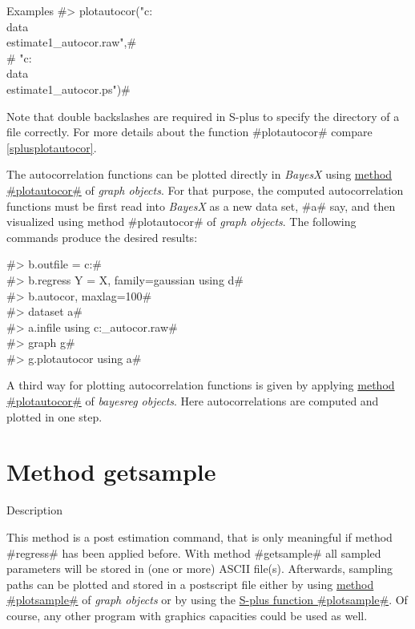 \begin{stanza}{Examples}
 #> plotautocor("c:\\data\\estimate1_autocor.raw",#\\
 #  "c:\\data\\estimate1_autocor.ps")#

Note that double backslashes are required in S-plus to specify the
directory of a file correctly. For more details about the function
#plotautocor# compare \autoref{splusplotautocor}.

The autocorrelation functions can be plotted directly in {\em
BayesX} using \hyperref[graphplotautocor]{method #plotautocor#} of
{\em graph objects}. For that purpose, the computed autocorrelation
functions must be first read into {\em BayesX} as a new data set,
#a# say, and then visualized using method #plotautocor# of {\em
graph objects}. The following commands produce the desired results:

#> b.outfile = c:\data{}# \\
#> b.regress Y = X, family=gaussian using d# \\
#> b.autocor, maxlag=100# \\
#> dataset a# \\
#> a.infile using c:\data{}_autocor.raw# \\
#> graph g# \\
#> g.plotautocor using a#

A third way for plotting autocorrelation functions is given by
applying \hyperref[plotautocor]{method #plotautocor#} of {\em
bayesreg objects}. Here autocorrelations are computed and plotted in
one step.
\end{stanza}

\clearpage

\section{Method getsample}
\label{bayesgetsample} 

\begin{stanza}{Description}

This method is a post estimation command, that is only meaningful if
method #regress# has been applied before. With method #getsample#
all sampled parameters will be stored in (one or more) ASCII
file(s). Afterwards, sampling paths can be plotted and stored in a
postscript file either by using \hyperref[graphplotsample]{method
#plotsample#} of {\em graph objects} or by using the
\hyperref[splusplotsample]{S-plus function #plotsample#}. Of course,
any other program with graphics capacities could be used as well.
\end{stanza}

